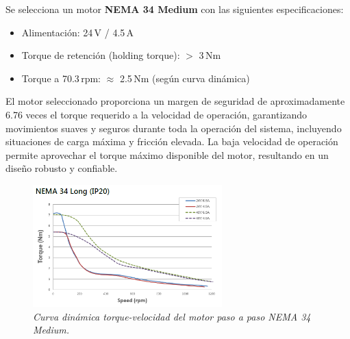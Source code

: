 Se selecciona un motor \textbf{NEMA 34 Medium} con las siguientes especificaciones:
\begin{itemize}[label=$\bullet$]
    \item Alimentación: 24\,V / 4.5\,A
    \item Torque de retención (holding torque): $>$ 3\,Nm
    \item Torque a 70.3\,rpm: $\approx$ 2.5\,Nm (según curva dinámica)
\end{itemize}

El motor seleccionado proporciona un margen de seguridad de aproximadamente 6.76 veces el torque requerido a la velocidad de operación, garantizando movimientos suaves y seguros durante toda la operación del sistema, incluyendo situaciones de carga máxima y fricción elevada. La baja velocidad de operación permite aprovechar el torque máximo disponible del motor, resultando en un diseño robusto y confiable.

\begin{figure}[H]
    \centering
    \includegraphics[width=0.65\textwidth]{img/Nema34.png}
    \caption{\textit{Curva dinámica torque-velocidad del motor paso a paso NEMA 34 Medium.}}
    \label{fig:Curva_din_nema34}
\end{figure}